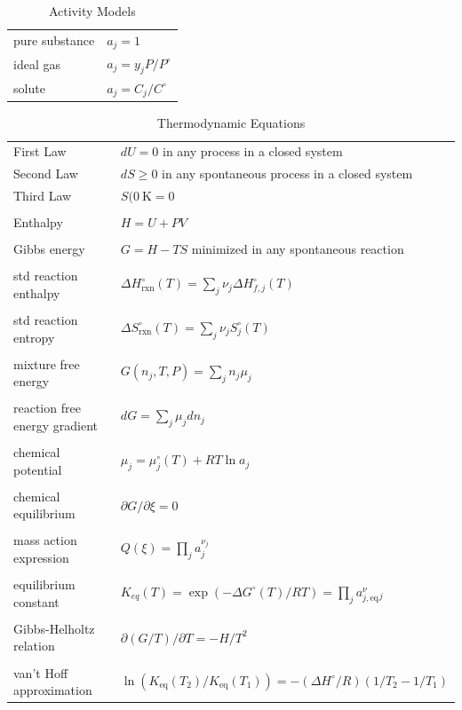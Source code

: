 \documentclass[11pt]{article}
\begin{document}
\begin{table}[htbp]
\caption{Activity Models}
\centering
\begin{tabular}{ll}
\hline
pure substance & \(a_j = 1\)\\
ideal gas & \(a_j =y_j P/P^\circ\)\\
solute & \(a_j = C_j/C^\circ\)\\
\hline
\end{tabular}
\end{table}

\begin{table}[htbp]
\caption{Thermodynamic Equations}
\centering
\begin{tabular}{ll}
\hline
First Law & \(dU = 0\) in any process in a closed system\\
Second Law & \(dS \ge 0\) in any spontaneous process in a closed system\\
Third Law & \(S(\SI{0}{\kelvin} = 0\)\\
 & \\
Enthalpy & \(H = U + PV\)\\
 & \\
Gibbs energy & \(G = H - T S\)  minimized in any spontaneous reaction\\
 & \\
std reaction enthalpy & \(\Delta H_\text{rxn}^\circ(T) = \sum_j \nu_j \Delta H_{f,j}^\circ(T)\)\\
 & \\
std reaction entropy & \(\Delta S_\text{rxn}^\circ(T) = \sum_j \nu_j S^\circ_j(T)\)\\
 & \\
mixture free energy & \(G(n_j,T,P) = \sum_j n_j \mu_j\)\\
 & \\
reaction free energy gradient & \(dG = \sum_j \mu_j dn_j\)\\
 & \\
chemical potential & \(\mu_j = \mu_j^\circ(T) + RT \ln a_j\)\\
 & \\
chemical equilibrium & \(\partial G/\partial \xi = 0\)\\
 & \\
mass action expression & \(Q(\xi) = \prod_j a_j^{\nu_j}\)\\
 & \\
equilibrium constant & \(K_{eq}(T)  = \exp(-\Delta G^\circ(T)/RT ) = \prod_j a_{j,\text{eq}}^\nu_j\)\\
 & \\
Gibbs-Helholtz relation & \(\partial (G/T) /\partial T  = -H/T^2\)\\
 & \\
van't Hoff approximation & \[\ln\left ( K_\text{eq}(T_2)/K_\text{eq}(T_1) \right ) = -\left ( \Delta H^\circ /R\right ) \left ( 1/T_2 - 1/T_1 \right ) \]\\
\hline
\end{tabular}
\end{table}
\end{document}

